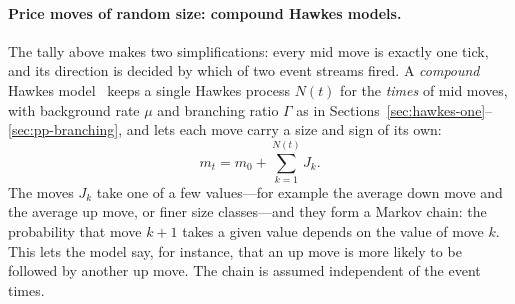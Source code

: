\paragraph{Price moves of random size: compound Hawkes models.} The tally above makes two simplifications:
every mid move is exactly one tick, and its direction is decided by which of two event streams fired. A
\emph{compound} Hawkes model~\citep{swishchuk2019chp,swishchuk2020gchp} keeps a single Hawkes process $N(t)$
for the \emph{times} of mid moves, with background rate $\mu$ and branching ratio $\Gamma$ as in
Sections~\ref{sec:hawkes-one}--\ref{sec:pp-branching}, and lets each move carry a size and sign of its own:
\begin{equation}
  m_t = m_0 + \sum_{k=1}^{N(t)} J_k .
\label{eq:chp}
\end{equation}
The moves $J_k$ take one of a few values---for example the average down move and the average up move, or
finer size classes---and they form a Markov chain: the probability that move $k+1$ takes a given value depends
on the value of move $k$. This lets the model say, for instance, that an up move is more likely to be followed
by another up move. The chain is assumed independent of the event times.

